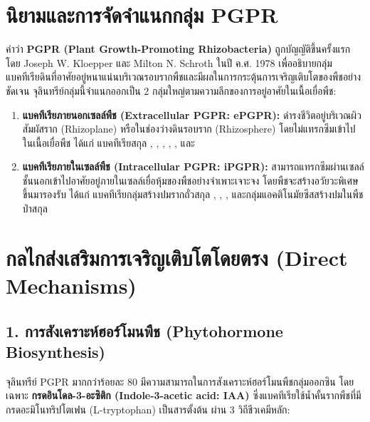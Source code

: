 \section{นิยามและการจัดจำแนกกลุ่ม PGPR}

คำว่า \textbf{PGPR (Plant Growth-Promoting Rhizobacteria)} ถูกบัญญัติขึ้นครั้งแรกโดย Joseph W. Kloepper และ Milton N. Schroth ในปี ค.ศ. 1978 เพื่ออธิบายกลุ่มแบคทีเรียดินที่อาศัยอยู่หนาแน่นบริเวณรอบรากพืชและมีผลในการกระตุ้นการเจริญเติบโตของพืชอย่างชัดเจน จุลินทรีย์กลุ่มนี้จำแนกออกเป็น 2 กลุ่มใหญ่ตามความลึกของการอยู่อาศัยในเนื้อเยื่อพืช:

\begin{enumerate}
    \item \textbf{แบคทีเรียภายนอกเซลล์พืช (Extracellular PGPR: ePGPR):} ดำรงชีวิตอยู่บริเวณผิวสัมผัสราก (Rhizoplane) หรือในช่องว่างดินรอบราก (Rhizosphere) โดยไม่แทรกซึมเข้าไปในเนื้อเยื่อพืช ได้แก่ แบคทีเรียสกุล , , , , , และ 
    \item \textbf{แบคทีเรียภายในเซลล์พืช (Intracellular PGPR: iPGPR):} สามารถแทรกซึมผ่านเซลล์ชั้นนอกเข้าไปอาศัยอยู่ภายในเซลล์เยื่อหุ้มของพืชอย่างจำเพาะเจาะจง โดยพืชจะสร้างอวัยวะพิเศษขึ้นมารองรับ ได้แก่ แบคทีเรียกลุ่มสร้างปมรากถั่วสกุล , , , และกลุ่มแอคติโนมัยซีสสร้างปมในพืชป่าสกุล 
\end{enumerate}

\section{กลไกส่งเสริมการเจริญเติบโตโดยตรง (Direct Mechanisms)}

\subsection{1. การสังเคราะห์ฮอร์โมนพืช (Phytohormone Biosynthesis)}

จุลินทรีย์ PGPR มากกว่าร้อยละ 80 มีความสามารถในการสังเคราะห์ฮอร์โมนพืชกลุ่มออกซิน โดยเฉพาะ \textbf{กรดอินโดล-3-อะซิติก (Indole-3-acetic acid: IAA)} ซึ่งแบคทีเรียใช้น้ำคั้นรากพืชที่มีกรดอะมิโนทริปโตเฟน (L-tryptophan) เป็นสารตั้งต้น ผ่าน 3 วิถีชีวเคมีหลัก:

